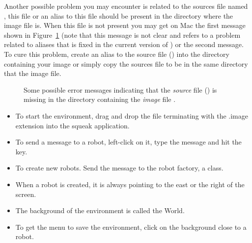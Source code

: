 Another possible problem you may encounter is related to the sources file named , this file or an alias to this file should be present in the directory where the image file is. When this file is not present you may get on Mac the first message shown in Figure~\ref{fig:sourcesMissing} (note that this message is not clear and refers to a problem related to aliases that is fixed in the current version of \sq) or the second message. To cure this problem, create an alias to the source file () into the directory containing  your image or simply copy the sources file  to be in the same directory that the image file.

\begin{figure}[!h]%
\caption{Some possible error messages indicating that the \textit{source} file () is missing in the directory containing the \textit{image} file .\label{fig:sourcesMissing}}
\end{figure}





\summa

\begin{itemize}
\item To start the environment, drag and drop the file terminating with the .image extension into the squeak application.

\item To send a message to a robot, left-click on it, type the message and hit the  key.

\item To create new robots. Send the message  to the robot factory, a class.

\item When a robot is created, it is always pointing to the east or the right of the screen. 

\item The background of the environment is called the World.

\item To get the menu to save the environment, click on the background close to a robot.
\end{itemize}



\ifx\wholebook\relax\else\fi



